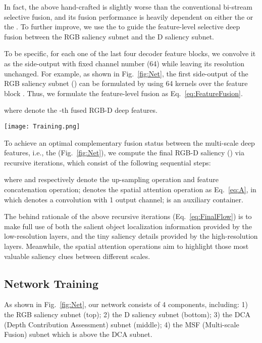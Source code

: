 \documentclass[journal]{IEEEtran}
\begin{document}
In fact, the above hand-crafted  is slightly worse than the conventional bi-stream selective fusion, and its fusion performance is heavily dependent on either the  or the .
To further improve, we use the  to guide the feature-level selective deep fusion between the RGB saliency subnet and the D saliency subnet.

To be specific, for each one of the last four decoder feature blocks, we convolve it as the side-output with fixed channel number (64) while leaving its resolution unchanged.
For example, as shown in Fig.~\ref{fig:Net}, the first side-output of the RGB saliency subnet () can be formulated by using 64  kernels over the feature block .
Thus, we formulate the feature-level fusion as Eq.~\ref{eq:FeatureFusion}.

where  denote the -th fused RGB-D deep features.

\begin{figure*}
\begin{center}
\texttt{[image: Training.png]}
\end{center}
   \caption{The demonstrations of our stage-wise training scheme (Sec.~\ref{sec:NT}).}
\label{fig:Training}
\end{figure*}

To achieve an optimal complementary fusion status between the multi-scale deep features, i.e., the  (Fig.~\ref{fig:Net}), we compute the final RGB-D saliency () via recursive iterations, which consist of the following sequential steps:

where  and  respectively denote the up-sampling operation and feature concatenation operation;  denotes the spatial attention operation as Eq.~\ref{eq:A}, in which  denotes a  convolution with 1 output channel;  is an auxiliary container.


The behind rationale of the above recursive iterations (Eq.~\ref{eq:FinalFlow}) is to make full use of both the salient object localization information provided by the low-resolution layers, and the tiny saliency details provided by the high-resolution layers.
Meanwhile, the spatial attention operations aim to highlight those most valuable saliency clues between different scales.

\subsection{Network Training}
\label{sec:NT}
As shown in Fig.~\ref{fig:Net}, our network consists of 4 components, including: 1) the RGB saliency subnet (top); 2) the D saliency subnet (bottom); 3) the DCA (Depth Contribution Assessment) subnet (middle); 4) the MSF (Multi-scale Fusion) subnet which is above the DCA subnet.
\end{document}
